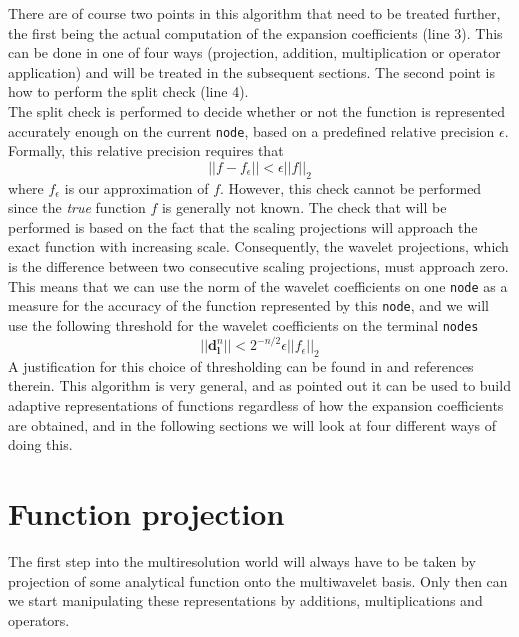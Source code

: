 \noindent
There are of course two points in this algorithm that need to be treated
further, the first being the actual computation of the expansion coefficients 
(line 3). This can be done in one of four ways (projection, addition,
multiplication or operator application) and will be treated in the
subsequent sections. The second point is how to perform the split check 
(line 4).\\

\noindent
The split check is performed to decide whether or not the function is 
represented accurately enough on the current \texttt{node}, based on a 
predefined relative precision $\epsilon$. Formally, this relative precision 
requires that 
\begin{equation}
	||f-f_\epsilon||<\epsilon ||f||_2
\end{equation}
where $f_\epsilon$ is our approximation of $f$. However, this check cannot 
be performed since the \emph{true} function $f$ is generally not known. 
The check that will be performed is based on the fact that the scaling 
projections will approach the exact function with increasing scale. 
Consequently, the wavelet projections, which is the difference between two 
consecutive scaling projections, must approach zero. This means that we can use
the norm of the wavelet coefficients on one \texttt{node} as a measure for the 
accuracy of the function represented by this \texttt{node}, and we will use the
following threshold for the wavelet coefficients on the terminal \texttt{nodes}
\begin{equation}
	||\boldsymbol{d}^n_{\boldsymbol{l}}|| < 2^{-n/2}\epsilon ||f_\epsilon||_2
\end{equation}
A justification for this choice of thresholding can be found in
\cite{Fossgaard} and
references therein. This algorithm is very general, and as pointed out it can 
be used to build adaptive representations of functions regardless of how the 
expansion coefficients are obtained, and in the following sections we will look
at four different ways of doing this.

\section{Function projection}
The first step into the multiresolution world will always have to be taken by
projection of some analytical function onto the multiwavelet basis. Only then
can we start manipulating these representations by additions, multiplications
and operators.

